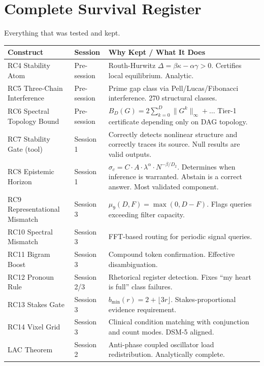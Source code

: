 \documentclass[11pt]{article}
\begin{document}
\section{Complete Survival Register}
\label{sec:survival}

Everything that was tested and kept.

\begin{longtable}{p{3.5cm}p{2cm}p{7cm}}
\toprule
\textbf{Construct} & \textbf{Session} & \textbf{Why Kept / What It Does} \\
\midrule
RC4 Stability Atom & Pre-session & Routh-Hurwitz $\Delta = \beta\kappa - \alpha\gamma > 0$. Certifies local equilibrium. Analytic. \\
\addlinespace
RC5 Three-Chain Interference & Pre-session & Prime gap class via Pell/Lucas/Fibonacci interference. 270 structural classes. \\
\addlinespace
RC6 Spectral Topology Bound & Pre-session & $B_D(G) = 2\sum_{k=0}^D \|G^k\|_\infty + \ldots$ Tier-1 certificate depending only on DAG topology. \\
\addlinespace
RC7 Stability Gate (tool) & Session 1 & Correctly detects nonlinear structure and correctly traces its source. Null results are valid outputs. \\
\addlinespace
RC8 Epistemic Horizon & Session 1 & $\sigma_c = C \cdot A \cdot \lambda^\alpha \cdot N^{-\beta/D_2}$. Determines when inference is warranted. Abstain is a correct answer. Most validated component. \\
\addlinespace
RC9 Representational Mismatch & Session 3 & $\mu_9(D,F) = \max(0, D-F)$. Flags queries exceeding filter capacity. \\
\addlinespace
RC10 Spectral Mismatch & Session 3 & FFT-based routing for periodic signal queries. \\
\addlinespace
RC11 Bigram Boost & Session 3 & Compound token confirmation. Effective disambiguation. \\
\addlinespace
RC12 Pronoun Rule & Session 2/3 & Rhetorical register detection. Fixes ``my heart is full'' class failures. \\
\addlinespace
RC13 Stakes Gate & Session 3 & $b_{\min}(r) = 2 + \lfloor 3r \rfloor$. Stakes-proportional evidence requirement. \\
\addlinespace
RC14 Vixel Grid & Session 3 & Clinical condition matching with conjunction and count modes. DSM-5 aligned. \\
\addlinespace
LAC Theorem & Session 2 & Anti-phase coupled oscillator load redistribution. Analytically complete. \\

\end{longtable}
\end{document}
